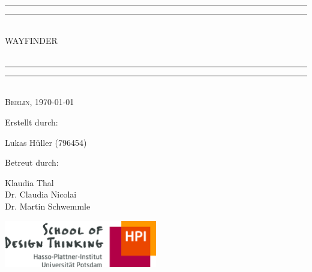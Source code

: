 \begin{titlepage}
    \textheight
    \centering
    \vspace*{\baselineskip}
    \rule{\textwidth}{1.6pt}\vspace*{-\baselineskip}\vspace*{2pt}
    \rule{\textwidth}{0.4pt}\\%
    {\Huge WAYFINDER\\
    \vspace*{12pt} %
    \LARGE \mytitle}\\[0.2\baselineskip]
    \rule{\textwidth}{0.4pt}\vspace*{-\baselineskip}\vspace{3.2pt}
    \rule{\textwidth}{1.6pt}\\[\baselineskip]
    \scshape
    Berlin, \today\par
    \vspace*{2\baselineskip}
    Erstellt durch: \\[\baselineskip]
    {\Large Lukas Hüller (796454)\par}\bigbreak
    Betreut durch:\bigbreak 
    {\Large Klaudia Thal \\ Dr. Claudia Nicolai \\ Dr. Martin Schwemmle\par}\bigbreak\bigbreak
    \vfill
    \includegraphics[width=0.5\textwidth]{img/hpi_dschool_logo.jpg}
  \end{titlepage}